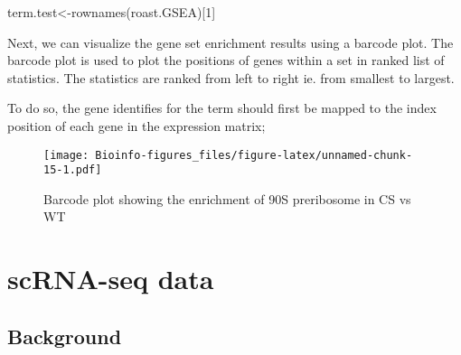 \documentclass[
  openany]{book}
\newenvironment{Shaded}{\begin{snugshade}}{\end{snugshade}}
\newcommand{\AttributeTok}[1]{\textcolor[rgb]{0.77,0.63,0.00}{#1}}
\newcommand{\DecValTok}[1]{\textcolor[rgb]{0.00,0.00,0.81}{#1}}
\newcommand{\FunctionTok}[1]{\textcolor[rgb]{0.00,0.00,0.00}{#1}}
\newcommand{\NormalTok}[1]{#1}
\newcommand{\OtherTok}[1]{\textcolor[rgb]{0.56,0.35,0.01}{#1}}
\newcommand{\SpecialCharTok}[1]{\textcolor[rgb]{0.00,0.00,0.00}{#1}}
\newcommand{\StringTok}[1]{\textcolor[rgb]{0.31,0.60,0.02}{#1}}
\begin{document}
\begin{Shaded}
\begin{Highlighting}[]
\NormalTok{term.test}\OtherTok{\textless{}{-}}\FunctionTok{rownames}\NormalTok{(roast.GSEA)[}\DecValTok{1}\NormalTok{]}
\end{Highlighting}
\end{Shaded}

Next, we can visualize the gene set enrichment results using a barcode plot. The barcode plot is used to plot the positions of genes within a set in ranked list of statistics. The statistics are ranked from left to right ie. from smallest to largest.

To do so, the gene identifies for the term should first be mapped to the index position of each gene in the expression matrix;

\begin{Shaded}
\end{Shaded}

\begin{figure}
\centering
\texttt{[image: Bioinfo-figures\_files/figure-latex/unnamed-chunk-15-1.pdf]}
\caption{\label{fig:unnamed-chunk-15}Barcode plot showing the enrichment of 90S preribosome in CS vs WT}
\end{figure}

\vspace{-100pt}

\vspace{-100pt}

\hypertarget{scrna-seq-data-1}{%
\chapter{scRNA-seq data}\label{scrna-seq-data-1}}

\hypertarget{background-1}{%
\section{Background}\label{background-1}}
\end{document}
